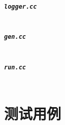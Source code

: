 \documentclass[format=draft,language=chinese,category=academic-report]{hustreport}
\begin{document}
\paragraph{{\tt logger.cc}}
\inputminted[linenos=true]{cpp}{../../src/project/Parser/logger.cc}
\paragraph{{\tt gen.cc}}
\inputminted[linenos=true]{cpp}{../../src/project/Parser/gen.cc}
\paragraph{{\tt run.cc}}
\inputminted[linenos=true]{cpp}{../../src/project/Parser/run.cc}

\chapter{测试用例}\label{ch:test}
\end{document}

